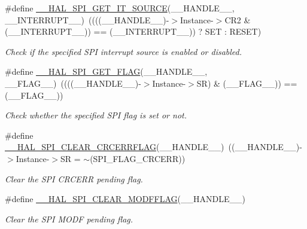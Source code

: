 \begin{DoxyCompactItemize}
\item 
\#define \hyperlink{group___s_p_i___exported___macros_gabdaab061e4603331a0ec4b9d651df0b5}{\+\_\+\+\_\+\+H\+A\+L\+\_\+\+S\+P\+I\+\_\+\+G\+E\+T\+\_\+\+I\+T\+\_\+\+S\+O\+U\+R\+CE}(\+\_\+\+\_\+\+H\+A\+N\+D\+L\+E\+\_\+\+\_\+,  \+\_\+\+\_\+\+I\+N\+T\+E\+R\+R\+U\+P\+T\+\_\+\+\_\+)~((((\+\_\+\+\_\+\+H\+A\+N\+D\+L\+E\+\_\+\+\_\+)-\/$>$Instance-\/$>$C\+R2 \& (\+\_\+\+\_\+\+I\+N\+T\+E\+R\+R\+U\+P\+T\+\_\+\+\_\+)) == (\+\_\+\+\_\+\+I\+N\+T\+E\+R\+R\+U\+P\+T\+\_\+\+\_\+)) ? S\+ET \+: R\+E\+S\+ET)
\begin{DoxyCompactList}\small\item\em Check if the specified S\+PI interrupt source is enabled or disabled. \end{DoxyCompactList}\item 
\#define \hyperlink{group___s_p_i___exported___macros_gaa0bbe5fb55f93fd277ddb6acf58cec53}{\+\_\+\+\_\+\+H\+A\+L\+\_\+\+S\+P\+I\+\_\+\+G\+E\+T\+\_\+\+F\+L\+AG}(\+\_\+\+\_\+\+H\+A\+N\+D\+L\+E\+\_\+\+\_\+,  \+\_\+\+\_\+\+F\+L\+A\+G\+\_\+\+\_\+)~((((\+\_\+\+\_\+\+H\+A\+N\+D\+L\+E\+\_\+\+\_\+)-\/$>$Instance-\/$>$SR) \& (\+\_\+\+\_\+\+F\+L\+A\+G\+\_\+\+\_\+)) == (\+\_\+\+\_\+\+F\+L\+A\+G\+\_\+\+\_\+))
\begin{DoxyCompactList}\small\item\em Check whether the specified S\+PI flag is set or not. \end{DoxyCompactList}\item 
\#define \hyperlink{group___s_p_i___exported___macros_gad1cb4100b67726531ad426d300f4cd26}{\+\_\+\+\_\+\+H\+A\+L\+\_\+\+S\+P\+I\+\_\+\+C\+L\+E\+A\+R\+\_\+\+C\+R\+C\+E\+R\+R\+F\+L\+AG}(\+\_\+\+\_\+\+H\+A\+N\+D\+L\+E\+\_\+\+\_\+)~((\+\_\+\+\_\+\+H\+A\+N\+D\+L\+E\+\_\+\+\_\+)-\/$>$Instance-\/$>$SR = $\sim$(S\+P\+I\+\_\+\+F\+L\+A\+G\+\_\+\+C\+R\+C\+E\+RR))
\begin{DoxyCompactList}\small\item\em Clear the S\+PI C\+R\+C\+E\+RR pending flag. \end{DoxyCompactList}\item 
\#define \hyperlink{group___s_p_i___exported___macros_ga6c88becbe528c542156bc201622efba2}{\+\_\+\+\_\+\+H\+A\+L\+\_\+\+S\+P\+I\+\_\+\+C\+L\+E\+A\+R\+\_\+\+M\+O\+D\+F\+F\+L\+AG}(\+\_\+\+\_\+\+H\+A\+N\+D\+L\+E\+\_\+\+\_\+)
\begin{DoxyCompactList}\small\item\em Clear the S\+PI M\+O\+DF pending flag. \end{DoxyCompactList}\item 

\end{DoxyCompactItemize}
